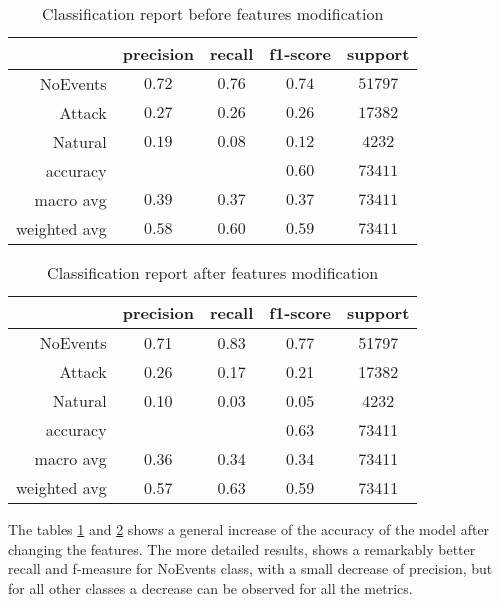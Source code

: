 \begin{table}[H]
    \centering
    \caption{Classification report before features modification} \label{tab:clreport:before}
    \begin{tabular}{rcccc}\toprule
        & precision    &recall & f1-score  & support \\\midrule
            NoEvents  &   $  0.72 $  &  $ 0.76 $  &  $ 0.74 $  & $ 51797 $\\
              Attack   &  $  0.27 $   & $ 0.26 $  &  $ 0.26 $  & $ 17382 $\\
             Natural   &  $  0.19 $   & $ 0.08 $  &  $ 0.12 $  & $  4232 $\\
            accuracy   &            &          &  $0.60$  &   $73411$ \\
           macro avg   &  $  0.39 $   & $ 0.37 $  &  $ 0.37 $  & $ 73411 $\\
        weighted avg   &  $  0.58 $  &  $ 0.60 $  &  $ 0.59 $ &  $ 73411 $\\\bottomrule
    \end{tabular}
\end{table}

\begin{table}[H]
    \centering
    \caption{Classification report after features modification} \label{tab:clreport:after}   
    \begin{tabular}{rcccc}\toprule
        &precision   & recall & f1-score &  support  \\\midrule

        NoEvents   &    0.71   &   0.83  &    0.77   &  51797 \\
          Attack    &   0.26   &   0.17  &    0.21   &  17382 \\
         Natural   &    0.10   &   0.03   &   0.05  &    4232 \\
    
        accuracy    &          &          &   0.63   &  73411 \\
       macro avg    &   0.36   &   0.34   &   0.34   &  73411 \\
    weighted avg     &  0.57   &   0.63   &   0.59   &  73411    \\     \bottomrule   
    \end{tabular}
\end{table}

The tables \ref{tab:clreport:before} and \ref{tab:clreport:after} shows a general increase of the accuracy of the model after changing the features. The more detailed results, shows a remarkably better recall and f-measure for NoEvents class, with a small decrease of precision, but for all other classes a decrease can be observed for all the metrics. 


